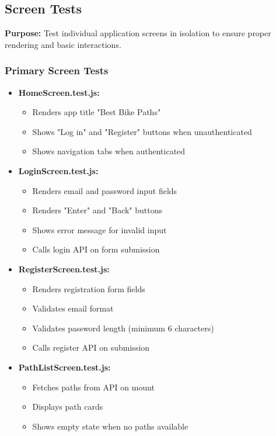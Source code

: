 \subsection{Screen Tests}
\label{subsec:screen_tests}

\textbf{Purpose:} Test individual application screens in isolation to ensure proper rendering and basic interactions.

\subsubsection{Primary Screen Tests}
\label{subsubsec:primary_screen_tests}

\begin{itemize}
    \item \textbf{HomeScreen.test.js:}
    \begin{itemize}
        \item Renders app title "Best Bike Paths"
        \item Shows "Log in" and "Register" buttons when unauthenticated
        \item Shows navigation tabs when authenticated
    \end{itemize}
    
    \item \textbf{LoginScreen.test.js:}
    \begin{itemize}
        \item Renders email and password input fields
        \item Renders "Enter" and "Back" buttons
        \item Shows error message for invalid input
        \item Calls login API on form submission
    \end{itemize}
    
    \item \textbf{RegisterScreen.test.js:}
    \begin{itemize}
        \item Renders registration form fields
        \item Validates email format
        \item Validates password length (minimum 6 characters)
        \item Calls register API on submission
    \end{itemize}
    
    \item \textbf{PathListScreen.test.js:}
    \begin{itemize}
        \item Fetches paths from API on mount
        \item Displays path cards
        \item Shows empty state when no paths available
    \end{itemize}
    

\end{itemize}
